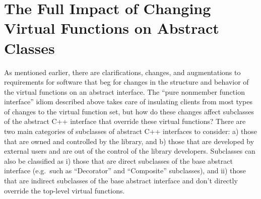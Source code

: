 \documentclass[pdf,ps2pdf,11pt]{SANDreport}
\begin{document}
%
\section{The Full Impact of Changing Virtual Functions on Abstract Classes}
%

As mentioned earlier, there are clarifications, changes, and augmentations to
requirements for software that beg for changes in the structure and behavior
of the virtual functions on an abstract interface.  The ``pure nonmember
function interface'' idiom described above takes care of insulating clients
from most types of changes to the virtual function set, but how do these
changes affect subclasses of the abstract C++ interface that override these
virtual functions?  There are two main categories of subclasses of abstract
C++ interfaces to consider: a) those that are owned and controlled by the
library, and b) those that are developed by external users and are out of the
control of the library developers.  Subclasses can also be classified as i)
those that are direct subclasses of the base abstract interface (e.g.\ such as
``Decorator'' and ``Composite'' subclasses), and ii) those that are indirect
subclasses of the base abstract interface and don't directly override the
top-level virtual functions.
\end{document}
